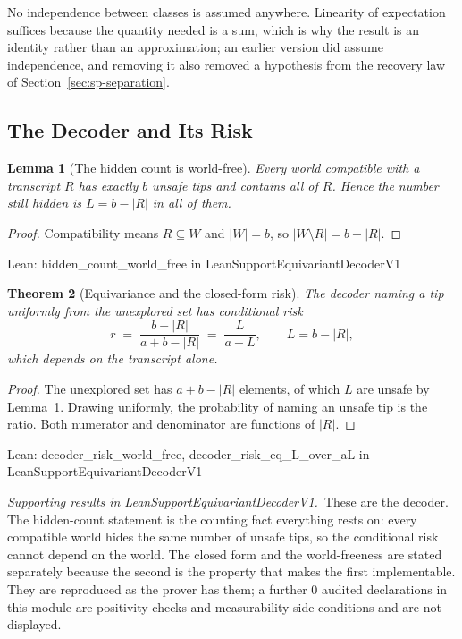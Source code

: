 \documentclass[conference]{IEEEtran}
\newtheorem{theorem}{Theorem}
\newtheorem{lemma}[theorem]{Lemma}
\theoremstyle{definition}
\newcommand{\lean}[1]{\textsf{\footnotesize #1}}
\newcommand{\leanbox}[1]{%
  \par\vspace{2pt}\noindent
  {\footnotesize\textsf{Lean: #1}}\par\vspace{2pt}}
\begin{document}
No independence between classes is assumed anywhere. Linearity of expectation suffices because
the quantity needed is a sum, which is why the result is an identity rather than an
approximation; an earlier version did assume independence, and removing it also removed a
hypothesis from the recovery law of Section~\ref{sec:sp-separation}.

\subsection{The Decoder and Its Risk}
\label{sec:sp-decoder}

\begin{lemma}[The hidden count is world-free]
\label{lem:sp-hidden}
Every world compatible with a transcript $R$ has exactly $b$ unsafe tips and contains all of
$R$. Hence the number still hidden is $L=b-|R|$ in all of them.
\end{lemma}

\begin{proof}
Compatibility means $R\subseteq W$ and $|W|=b$, so $|W\setminus R|=b-|R|$.
\end{proof}

\leanbox{\lean{hidden\_count\_world\_free} in \lean{LeanSupportEquivariantDecoderV1}}

\begin{theorem}[Equivariance and the closed-form risk]
\label{thm:sp-equivariant}
The decoder naming a tip uniformly from the unexplored set has conditional risk
\begin{equation}
r\;=\;\frac{b-|R|}{a+b-|R|}\;=\;\frac{L}{a+L},
\qquad L=b-|R|,
\label{eq:sp-decoder}
\end{equation}
which depends on the transcript alone.
\end{theorem}

\begin{proof}
The unexplored set has $a+b-|R|$ elements, of which $L$ are unsafe by
Lemma~\ref{lem:sp-hidden}. Drawing uniformly, the probability of naming an unsafe tip is the
ratio. Both numerator and denominator are functions of $|R|$.
\end{proof}

\leanbox{\lean{decoder\_risk\_world\_free}, \lean{decoder\_risk\_eq\_L\_over\_aL} in
\lean{LeanSupportEquivariantDecoderV1}}

\noindent\emph{Supporting results in \lean{LeanSupportEquivariantDecoderV1}.}~These are the decoder. The hidden-count statement is the counting fact everything rests on: every compatible world hides the same number of unsafe tips, so the conditional risk cannot depend on the world. The closed form and the world-freeness are stated separately because the second is the property that makes the first implementable. They are reproduced as the prover has them; a further $0$ audited declarations in this module are positivity checks and measurability side conditions and are not displayed.
\end{document}
